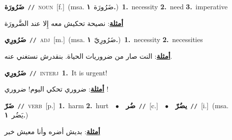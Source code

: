 \documentclass[10pt,a4paper,twoside]{article} %
\begin{document}
\begin{multicols}{2}
{\setlength\topsep{0pt}\textbf{\foreignlanguage{arabic}{ضَرُورَة}}\ {\color{gray}\texttt{//}\color{black}}\ \textsc{noun}\ [f.]\ \color{gray}(msa. \foreignlanguage{arabic}{ضَرُورَة}~\foreignlanguage{arabic}{\textbf{١.}})\color{black}\ \textbf{1.}~necessity  \textbf{2.}~need  \textbf{3.}~imperative\  \begin{flushright}\color{gray}\foreignlanguage{arabic}{\textbf{\underline{\foreignlanguage{arabic}{أمثلة}}}: نصيحة تحكيش معه إِلا عند الضَّرورَة}\end{flushright}\color{black}} \vspace{2mm}

{\setlength\topsep{0pt}\textbf{\foreignlanguage{arabic}{ضَرُورِي}}\ {\color{gray}\texttt{//}\color{black}}\ \textsc{adj}\ [m.]\ \color{gray}(msa. \foreignlanguage{arabic}{ضَرُورِيّ}~\foreignlanguage{arabic}{\textbf{١.}})\color{black}\ \textbf{1.}~necessity  \textbf{2.}~necessities\  \begin{flushright}\color{gray}\foreignlanguage{arabic}{\textbf{\underline{\foreignlanguage{arabic}{أمثلة}}}: النت صار من ضروريات الحياة. بنقدرش نستغني عنه.}\end{flushright}\color{black}} \vspace{2mm}

{\setlength\topsep{0pt}\textbf{\foreignlanguage{arabic}{ضَرُورِي}}\ {\color{gray}\texttt{//}\color{black}}\ \textsc{interj}\ \textbf{1.}~It is urgent!\  \begin{flushright}\color{gray}\foreignlanguage{arabic}{\textbf{\underline{\foreignlanguage{arabic}{أمثلة}}}: ضروري تحكي اليوم! ضروري !}\end{flushright}\color{black}} \vspace{2mm}

{\setlength\topsep{0pt}\textbf{\foreignlanguage{arabic}{ضَرّ}}\ {\color{gray}\texttt{//}\color{black}}\ \textsc{verb}\ [p.]\ \textbf{1.}~harm  \textbf{2.}~hurt\ \ $\bullet$\ \ \setlength\topsep{0pt}\textbf{\foreignlanguage{arabic}{ضُر}}\ {\color{gray}\texttt{//}\color{black}}\ [c.]\ \ $\bullet$\ \ \setlength\topsep{0pt}\textbf{\foreignlanguage{arabic}{يضُرّ}}\ {\color{gray}\texttt{//}\color{black}}\ [i.]\ \color{gray}(msa. \foreignlanguage{arabic}{يَضُر}~\foreignlanguage{arabic}{\textbf{١.}})\color{black}\  \begin{flushright}\color{gray}\foreignlanguage{arabic}{\textbf{\underline{\foreignlanguage{arabic}{أمثلة}}}: بديش أضره وأنا معيش خبر}\end{flushright}\color{black}} \vspace{2mm}


\end{multicols}
\end{document}
